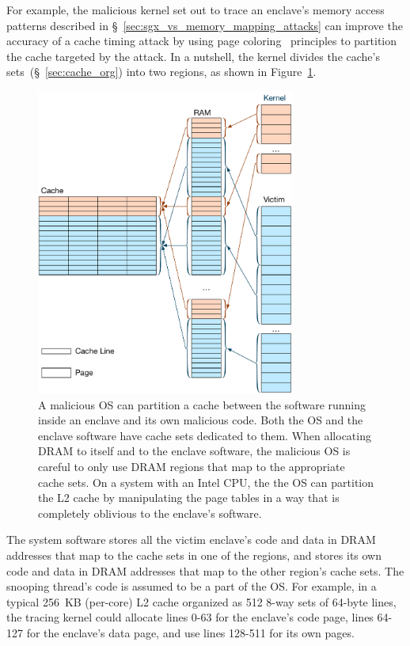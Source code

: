 For example, the malicious kernel set out to trace an enclave's memory access
patterns described in \S~\ref{sec:sgx_vs_memory_mapping_attacks} can improve
the accuracy of a cache timing attack by using page
coloring~\cite{kessler1992coloring} principles to
partition~\cite{lin2008coloring} the cache targeted by the attack. In a
nutshell, the kernel divides the cache's sets~(\S~\ref{sec:cache_org}) into
two regions, as shown in Figure~\ref{fig:cache_partitions}.

\begin{figure}[hbt]
  \centering
  \includegraphics[width=85mm]{figures/cache_partitions.pdf}
  \caption{
    A malicious OS can partition a cache between the software running inside an
    enclave and its own malicious code. Both the OS and the enclave software
    have cache sets dedicated to them. When allocating DRAM to itself and to
    the enclave software, the malicious OS is careful to only use DRAM regions
    that map to the appropriate cache sets. On a system with an Intel CPU, the
    the OS can partition the L2 cache by manipulating the page tables in a way
    that is completely oblivious to the enclave's software.
  }
  \label{fig:cache_partitions}
\end{figure}

The system software stores all the victim enclave's code and data in DRAM
addresses that map to the cache sets in one of the regions, and stores its own
code and data in DRAM addresses that map to the other region's cache sets.  The
snooping thread's code is assumed to be a part of the OS. For example, in a
typical 256~KB (per-core) L2 cache organized as 512 8-way sets of 64-byte
lines, the tracing kernel could allocate lines 0-63 for the enclave's code
page, lines 64-127 for the enclave's data page, and use lines 128-511 for its
own pages.

